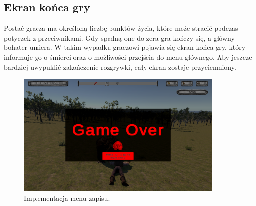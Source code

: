 \subsection{Ekran końca gry}
Postać gracza ma określoną liczbę punktów życia, które może stracić podczas potyczek z przeciwnikami. Gdy spadną one do zera gra kończy się, a główny bohater umiera.
W takim wypadku graczowi pojawia się ekran końca gry, który informuje go o śmierci oraz o możliwości przejścia do menu głównego. Aby jeszcze bardziej uwypuklić zakończenie 
rozgrywki, cały ekran zostaje przyciemniony.
\begin{figure}[htbp]
    \centering
    \includegraphics[width=0.9\textwidth]{images/ui/endgame_screen.png}
    \caption{Implementacja menu zapisu.}\label{fig:end_sc}
\end{figure}
\FloatBarrier
